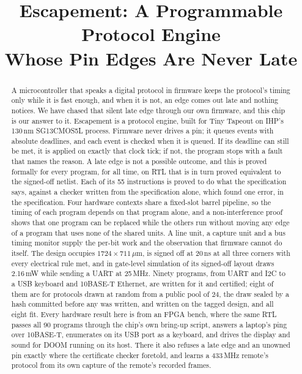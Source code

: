\documentclass[conference,letterpaper]{IEEEtran}
\begin{document}
\title{Escapement: A Programmable Protocol Engine\\ Whose Pin Edges Are Never Late}

\author{
}

\maketitle

\begin{abstract}
A microcontroller that speaks a digital protocol in firmware keeps the protocol's timing
only while it is fast enough, and when it is not, an edge comes out late and nothing
notices. We have chased that silent late edge through our own firmware, and this chip is our
answer to it. Escapement is a protocol engine, built for Tiny Tapeout on IHP's
130\,nm SG13CMOS5L process. Firmware never
drives a pin; it queues events with absolute deadlines, and each event is checked when it
is queued. If its deadline can still be met, it is applied on exactly that clock tick; if
not, the program stops with a fault that names the reason. A late edge is not a possible
outcome, and this is proved formally for every program, for all time, on RTL that is in
turn proved equivalent to the signed-off netlist. Each of its 55 instructions is proved to
do what the specification says, against a checker written from the specification alone,
which found one error, in the specification. Four hardware contexts share a
fixed-slot barrel pipeline, so the timing of each program depends on that program alone,
and a non-interference proof shows that one program can be replaced while the others run
without moving any edge of a program that uses none of the shared units. A line unit, a
capture unit and a bus timing monitor supply the per-bit work and the observation that
firmware cannot do itself. The design occupies $1724\times711\,\mu$m, is signed off at
20\,ns at all three corners with every electrical rule met, and in gate-level simulation
of its signed-off layout draws 2.16\,mW while sending a UART at 25\,MHz. Ninety programs, from UART and I2C to a
USB keyboard and 10BASE-T Ethernet, are written for it and certified; eight of them are
for protocols drawn at random from a public pool of 24, the draw sealed by a hash
committed before any was written, and written on the tagged design, and all eight fit.
Every hardware result here is from an FPGA bench, where the same RTL passes all 90
programs through the chip's own bring-up script, answers a laptop's ping over 10BASE-T, enumerates on its USB port as a
keyboard, and drives the display and sound for DOOM running on its host. There it also
refuses a late edge and an unowned pin exactly where the certificate checker foretold, and
learns a 433\,MHz remote's protocol from its own capture of the remote's recorded frames.
\end{abstract}
\end{document}
